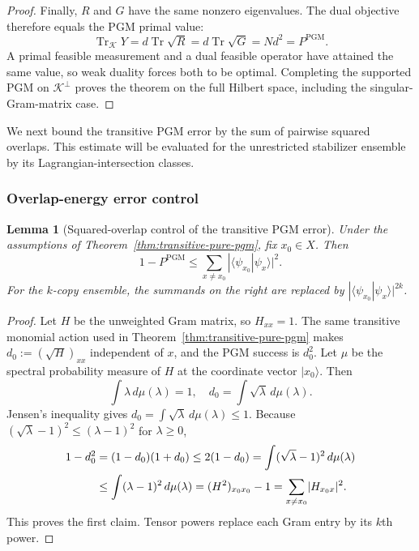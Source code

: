 \documentclass[11pt]{article}
\newcommand{\Tr}{\operatorname{Tr}}
\newcommand{\1}{\mathbf 1}
\newcommand{\PGM}{\mathrm{PGM}}
\newcommand{\ket}[1]{\lvert #1\rangle}
\theoremstyle{plain}
\newtheorem{lemma}[theorem]{Lemma}
\theoremstyle{definition}
\theoremstyle{remark}
\begin{document}
\begin{proof}
Finally, $R$ and $G$ have the same nonzero eigenvalues.  The dual objective
therefore equals the PGM primal value:
\begin{equation}
 \Tr_{\mathcal K}Y
 =d\Tr\sqrt R=d\Tr\sqrt G=Nd^2=P^{\PGM}.
 \label{eq:transitive-pgm-primal-dual-match}
\end{equation}
A primal feasible measurement and a dual feasible operator have attained the
same value, so weak duality forces both to be optimal.  Completing the
supported PGM on $\mathcal K^\perp$ proves the theorem on the full Hilbert
space, including the singular-Gram-matrix case.
\end{proof}

We next bound the transitive PGM error by the sum of pairwise squared
overlaps.  This estimate will be evaluated for the unrestricted stabilizer
ensemble by its Lagrangian-intersection classes.
\subsubsection{Overlap-energy error control}
\label{subsubsec:transitive-pgm-error-control}

\begin{lemma}[Squared-overlap control of the transitive PGM error]
\label{lem:transitive-pgm-overlap-energy}
Under the assumptions of Theorem~\ref{thm:transitive-pure-pgm}, fix
$x_0\in X$.  Then
\begin{equation}
 1-P^{\PGM}
 \le\sum_{x\ne x_0}|\langle\psi_{x_0}|\psi_x\rangle|^2.
 \label{eq:transitive-pgm-overlap-energy}
\end{equation}
For the $k$-copy ensemble, the summands on the right are replaced by
$|\langle\psi_{x_0}|\psi_x\rangle|^{2k}$.
\end{lemma}
\begin{proof}
Let $H$ be the unweighted Gram matrix, so $H_{xx}=1$.  The same transitive monomial action used in
Theorem~\ref{thm:transitive-pure-pgm} makes
$d_0:=(\sqrt H)_{xx}$ independent of $x$, and the PGM success is $d_0^2$.
Let $\mu$ be the spectral probability measure of $H$ at the coordinate
vector $\ket{x_0}$.  Then
\begin{equation}
 \int\lambda\,d\mu(\lambda)=1,
 \quad d_0=\int\sqrt\lambda\,d\mu(\lambda).
\end{equation}
Jensen's inequality gives
$d_0=\int\sqrt\lambda\,d\mu(\lambda)\le1$.  Because
$(\sqrt\lambda-1)^2\le(\lambda-1)^2$ for $\lambda\ge0$,
\begin{align}
 1-d_0^2
 &=(1-d_0)(1+d_0)\le2(1-d_0)
 =\int(\sqrt\lambda-1)^2\,d\mu(\lambda)\notag\\
 &\le\int(\lambda-1)^2\,d\mu(\lambda)
 =(H^2)_{x_0x_0}-1
 =\sum_{x\ne x_0}\lvert H_{x_0x}\rvert^2.
\end{align}
This proves the first claim.  Tensor powers replace each Gram entry by its
$k$th power.
\end{proof}
\end{document}
